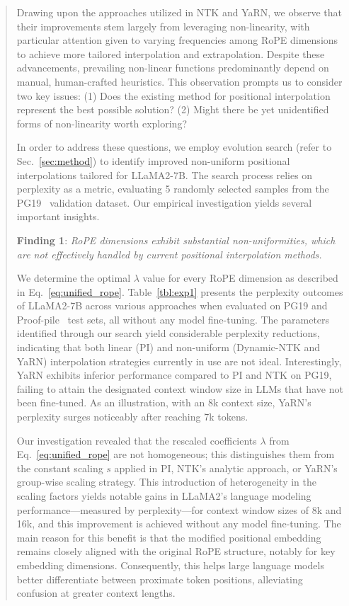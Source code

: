 \begin{abstract}
Drawing upon the approaches utilized in NTK and YaRN, we observe that their improvements stem largely from leveraging non-linearity, with particular attention given to varying frequencies among RoPE dimensions to achieve more tailored interpolation and extrapolation. Despite these advancements, prevailing non-linear functions predominantly depend on manual, human-crafted heuristics. This observation prompts us to consider two key issues: (1) Does the existing method for positional interpolation represent the best possible solution? (2) Might there be yet unidentified forms of non-linearity worth exploring?

In order to address these questions, we employ evolution search (refer to Sec.~\ref{sec:method}) to identify improved non-uniform positional interpolations tailored for LLaMA2-7B. The search process relies on perplexity as a metric, evaluating 5 randomly selected samples from the PG19~\cite{pg19} validation dataset. Our empirical investigation yields several important insights.

\textbf{Finding 1}: \textit{RoPE dimensions exhibit substantial non-uniformities, which are not effectively handled by current positional interpolation methods.}

We determine the optimal $\lambda$ value for every RoPE dimension as described in Eq.~\ref{eq:unified_rope}. Table~\ref{tbl:exp1} presents the perplexity outcomes of LLaMA2-7B across various approaches when evaluated on PG19 and Proof-pile~\cite{proof-pile} test sets, all without any model fine-tuning. The parameters identified through our search yield considerable perplexity reductions, indicating that both linear (PI) and non-uniform (Dynamic-NTK and YaRN) interpolation strategies currently in use are not ideal. Interestingly, YaRN exhibits inferior performance compared to PI and NTK on PG19, failing to attain the designated context window size in LLMs that have not been fine-tuned. As an illustration, with an 8k context size, YaRN’s perplexity surges noticeably after reaching 7k tokens.

Our investigation revealed that the rescaled coefficients $\lambda$ from Eq.~\ref{eq:unified_rope} are not homogeneous; this distinguishes them from the constant scaling $s$ applied in PI, NTK's analytic approach, or YaRN's group-wise scaling strategy. This introduction of heterogeneity in the scaling factors yields notable gains in LLaMA2's language modeling performance—measured by perplexity—for context window sizes of 8k and 16k, and this improvement is achieved without any model fine-tuning. The main reason for this benefit is that the modified positional embedding remains closely aligned with the original RoPE structure, notably for key embedding dimensions. Consequently, this helps large language models better differentiate between proximate token positions, alleviating confusion at greater context lengths.


\end{abstract}
